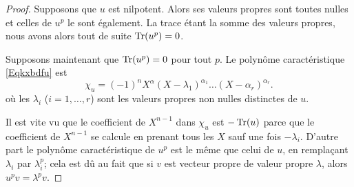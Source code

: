 \begin{proof}
    Supposons que \( u\) est nilpotent. Alors ses valeurs propres sont toutes nulles et celles de \( u^p\) le sont également. La trace étant la somme des valeurs propres, nous avons alors tout de suite \( \operatorname{Tr}(u^p)=0\).

    Supposons maintenant que \( \operatorname{Tr}(u^p)=0\) pour tout \( p\). Le polynôme caractéristique \eqref{Eqkxbdfu} est
    \begin{equation}    \label{EqfnCqWq}
        \chi_u=(-1)^nX^{\alpha}(X-\lambda_1)^{\alpha_1}\ldots (X-\alpha_r)^{\alpha_r}.
    \end{equation}
    où les \( \lambda_i\) (\( i=1,\ldots, r\)) sont les valeurs propres non nulles distinctes de \( u\).

    Il est vite vu que le coefficient de \( X^{n-1}\) dans \( \chi_u\) est \( -\operatorname{Tr}(u)\) parce que le coefficient de \( X^{n-1}\) se calcule en prenant tous les $X$ sauf une fois \( -\lambda_i\). D'autre part le polynôme caractéristique de \( u^p \) est le même que celui de \( u\), en remplaçant \( \lambda_i\) par \( \lambda_i^p\); cela est dû au fait que si \( v\) est vecteur propre de valeur propre \( \lambda\), alors \( u^pv=\lambda^pv\).


\end{proof}
